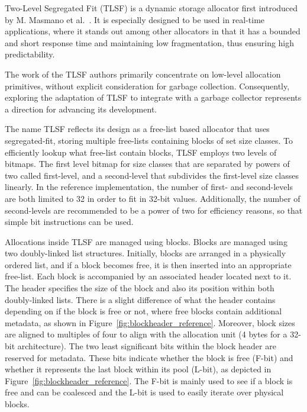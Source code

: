 
Two-Level Segregated Fit (TLSF) is a dynamic storage allocator first introduced by M. Masmano et al.~\cite{TLSF}. It is especially designed to be used in real-time applications, where it stands out among other allocators in that it has a bounded and short response time and maintaining low fragmentation, thus ensuring high predictability. 

The work of the TLSF authors primarily concentrate on low-level allocation primitives, without explicit consideration for garbage collection. Consequently, exploring the adaptation of TLSF to integrate with a garbage collector represents a direction for advancing its development.

The name TLSF reflects its design as a free-list based allocator that uses segregated-fit, storing multiple free-lists containing blocks of set size classes. To efficiently lookup what free-list contain blocks, TLSF employs two levels of bitmaps. The first level bitmap for size classes that are separated by powers of two called first-level, and a second-level that subdivides the first-level size classes linearly. In the reference implementation, the number of first- and second-levels are both limited to 32 in order to fit in 32-bit values. Additionally, the number of second-levels are recommended to be a power of two for efficiency reasons, so that simple bit instructions can be used.

Allocations inside TLSF are managed using blocks. Blocks are managed using two doubly-linked list structures. Initially, blocks are arranged in a physically ordered list, and if a block becomes free, it is then inserted into an appropriate free-list. Each block is accompanied by an associated header located next to it. The header specifies the size of the block and also its position within both doubly-linked lists. There is a slight difference of what the header contains depending on if the block is free or not, where free blocks contain additional metadata, as shown in Figure~\ref{fig:blockheader_reference}. Moreover, block sizes are aligned to multiples of four to align with the allocation unit (4 bytes for a 32-bit architecture). The two least significant bits within the block header are reserved for metadata. These bits indicate whether the block is free (F-bit) and whether it represents the last block within its pool (L-bit), as depicted in Figure~\ref{fig:blockheader_reference}. The F-bit is mainly used to see if a block is free and can be coalesced and the L-bit is used to easily iterate over physical blocks.

